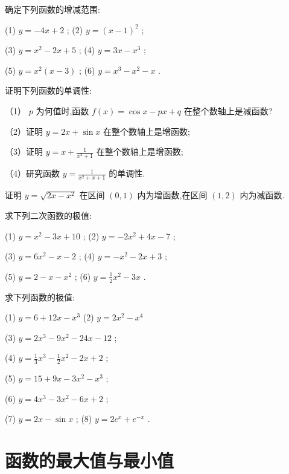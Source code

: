 \documentclass[lang=cn,newtx,10pt,scheme=chinese]{elegantbook}
\begin{document}
\begin{problemset}[习 题 十]

\item 确定下列函数的增减范围:

(1) \(y = - {4x} + 2\) ; (2) \(y = {\left( x - 1\right) }^{2}\) ;

(3) \(y = {x}^{2} - {2x} + 5\) ; (4) \(y = {3x} - {x}^{3}\) ;

(5) \(y = {x}^{2}\left( {x - 3}\right)\) ; (6) \(y = {x}^{3} - {x}^{2} - x\) .

\item 证明下列函数的单调性:

（1） \(p\) 为何值时,函数 \(f\left( x\right) = \cos x - {px} + q\) 在整个数轴上是减函数?

（2）证明 \(y = {2x} + \sin x\) 在整个数轴上是增函数;

（3）证明 \(y = x + \frac{1}{{x}^{2} + 1}\) 在整个数轴上是增函数;

（4）研究函数 \(y = \frac{1}{{x}^{2} + x + 1}\) 的单调性.

\item 证明 \(y = \sqrt{{2x} - {x}^{2}}\) 在区间 \(\left( {0,1}\right)\) 内为增函数,在区间 \(\left( {1,2}\right)\) 内为减函数.

\item 求下列二次函数的极值:

(1) \(y = {x}^{2} - {3x} + {10}\) ; (2) \(y = - 2{x}^{2} + {4x} - 7\) ;

(3) \(y = 6{x}^{2} - x - 2\) ; (4) \(y = - {x}^{2} - {2x} + 3\) ;

(5) \(y = 2 - x - {x}^{2}\) ; (6) \(y = \frac{1}{2}{x}^{2} - {3x}\) .

\item 求下列函数的极值:

(1) \(y = 6 + {12x} - {x}^{3}\) (2) \(y = 2{x}^{2} - {x}^{4}\)

(3) \(y = 2{x}^{3} - 9{x}^{2} - {24x} - {12}\) ;

(4) \(y = \frac{1}{3}{x}^{3} - \frac{1}{2}{x}^{2} - {2x} + 2\) ;

(5) \(y = {15} + {9x} - 3{x}^{2} - {x}^{3}\) ;

(6) \(y = 4{x}^{3} - 3{x}^{2} - {6x} + 2\) ;

(7) \(y = {2x} - \sin x\) ; (8) \(y = 2{e}^{x} + {e}^{-x}\) .

\end{problemset}

\section{函数的最大值与最小值}
\end{document}
